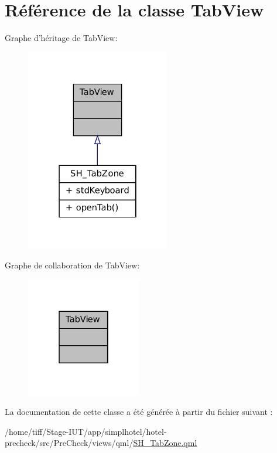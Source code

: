 \hypertarget{classTabView}{\section{Référence de la classe Tab\-View}
\label{classTabView}
}


Graphe d'héritage de Tab\-View\-:\nopagebreak
\begin{figure}[H]
\begin{center}
\leavevmode
\includegraphics[width=178pt]{classTabView__inherit__graph}
\end{center}
\end{figure}


Graphe de collaboration de Tab\-View\-:\nopagebreak
\begin{figure}[H]
\begin{center}
\leavevmode
\includegraphics[width=142pt]{classTabView__coll__graph}
\end{center}
\end{figure}


La documentation de cette classe a été générée à partir du fichier suivant \-:\begin{DoxyCompactItemize}
\item 
/home/tiff/\-Stage-\/\-I\-U\-T/app/simplhotel/hotel-\/precheck/src/\-Pre\-Check/views/qml/\hyperlink{SH__TabZone_8qml}{S\-H\-\_\-\-Tab\-Zone.\-qml}\end{DoxyCompactItemize}
